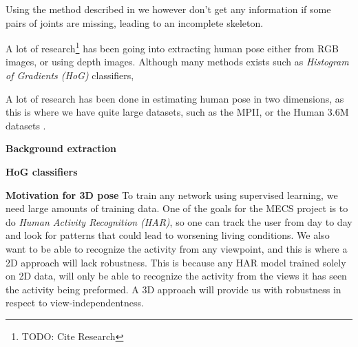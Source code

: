 Using the method described in \cite{cao2017realtime} we however don't get any information if some pairs of joints are missing, leading to an incomplete skeleton. 


A lot of research\footnote{TODO: Cite Research} has been going into extracting human pose either from RGB images, or using depth images. Although many methods exists such as \emph{Histogram of Gradients (HoG)} classifiers,

A lot of research has been done in estimating human pose in two dimensions, as this is where we have quite large datasets, such as the MPII, or the Human 3.6M datasets \cite{andriluka14cvpr,h36m_pami}.

\textbf{Background extraction}

\textbf{HoG classifiers}


\textbf{Motivation for 3D pose} To train any network using supervised learning, we need large amounts of training data. One of the goals for the MECS project is to do \emph{Human Activity Recognition (HAR)}, so one can track the user from day to day and look for patterns that could lead to worsening living conditions. We also want to be able to recognize the activity from any viewpoint, and this is where a 2D approach will lack robustness. This is because any HAR model trained solely on 2D data, will only be able to recognize the activity from the views it has seen the activity being preformed. A 3D approach will provide us with robustness in respect to view-independentness.


